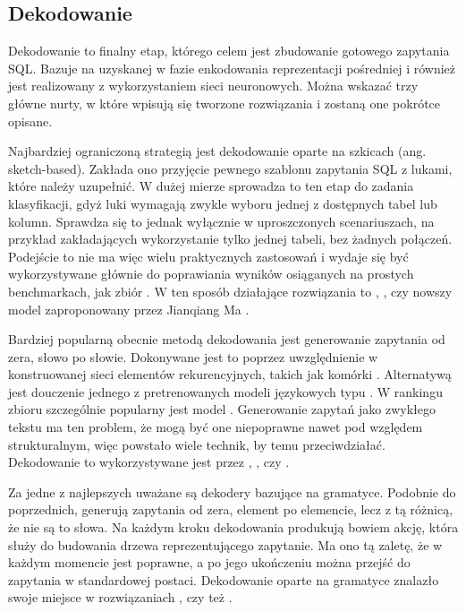 \subsection{Dekodowanie}
Dekodowanie to finalny etap, którego celem jest zbudowanie gotowego zapytania SQL. Bazuje na uzyskanej w fazie enkodowania reprezentacji pośredniej i również jest realizowany z wykorzystaniem sieci neuronowych. Można wskazać trzy główne nurty, w które wpisują się tworzone rozwiązania i zostaną one pokrótce opisane.

Najbardziej ograniczoną strategią jest dekodowanie oparte na szkicach (ang. sketch-based). Zakłada ono przyjęcie pewnego szablonu zapytania SQL z lukami, które należy uzupełnić. W dużej mierze sprowadza to ten etap do zadania klasyfikacji, gdyż luki wymagają zwykle wyboru jednej z dostępnych tabel lub kolumn.  Sprawdza się to jednak wyłącznie w uproszczonych scenariuszach, na przykład zakładających wykorzystanie tylko jednej tabeli, bez żadnych połączeń. Podejście to nie ma więc wielu praktycznych zastosowań i wydaje się być wykorzystywane głównie do poprawiania wyników osiąganych na prostych benchmarkach, jak zbiór . W ten sposób działające rozwiązania to  ,  , czy nowszy model zaproponowany przez Jianqiang Ma .

Bardziej popularną obecnie metodą dekodowania jest generowanie zapytania od zera, słowo po słowie. Dokonywane jest to poprzez uwzględnienie w konstruowanej sieci elementów rekurencyjnych, takich jak komórki  . Alternatywą jest douczenie jednego z pretrenowanych modeli językowych typu . W rankingu zbioru  szczególnie popularny jest model  . Generowanie zapytań jako zwykłego tekstu ma ten problem, że mogą być one niepoprawne nawet pod względem strukturalnym, więc powstało wiele technik, by temu przeciwdziałać. Dekodowanie to wykorzystywane jest przez  ,  , czy  .

Za jedne z najlepszych uważane są dekodery bazujące na gramatyce. Podobnie do poprzednich, generują zapytania od zera, element po elemencie, lecz z tą różnicą, że nie są to słowa. Na każdym kroku dekodowania produkują bowiem akcję, która służy do budowania drzewa  reprezentującego zapytanie. Ma ono tą zaletę, że w każdym momencie jest poprawne, a po jego ukończeniu można przejść do zapytania w standardowej postaci. Dekodowanie oparte na gramatyce znalazło swoje miejsce w rozwiązaniach  , czy też  .